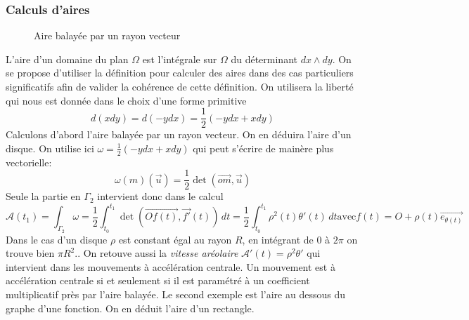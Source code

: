 \subsubsection{Calculs d'aires}
\begin{figure}
 \centering
  
  \caption{Aire balayée par un rayon vecteur}
  \label{fig:C2269_2}
\end{figure}
L'aire d'un domaine du plan $\Omega$ est l'intégrale sur $\Omega$ du déterminant $dx\wedge dy$.\newline
On se propose d'utiliser la définition pour calculer des aires dans des cas particuliers significatifs afin de valider la cohérence de cette définition. On utilisera la liberté qui nous est donnée dans le choix d'une forme primitive
\begin{displaymath}
 d(xdy)=d(-ydx)=\frac{1}{2}(-ydx + xdy)
\end{displaymath}
Calculons d'abord l'aire balayée par un rayon vecteur. On en déduira l'aire d'un disque.\newline
On utilise ici $\omega=\frac{1}{2}(-ydx + xdy)$ qui peut s'écrire de mainère plus vectorielle:
\begin{displaymath}
 \omega(m)(\overrightarrow u)=\frac{1}{2}\det(\overrightarrow{om},\overrightarrow u)
\end{displaymath}
Seule la partie en $\Gamma_2$ intervient donc dans le calcul
\begin{displaymath}
 \mathcal{A}(t_1)=\int_{\Gamma_2} \omega = \frac{1}{2}\int_{t_0}^{t_1}\det(\overrightarrow{Of(t)},\overrightarrow{f'}(t))\,dt
= \frac{1}{2}\int_{t_0}^{t_1}\rho^2(t)\theta'(t)\,dt \text{avec}
f(t)=O+\rho(t)\overrightarrow{e_{\theta(t)}}
\end{displaymath}
Dans le cas d'un disque $\rho$ est constant égal au rayon $R$, en intégrant de $0$ à $2\pi$ on trouve bien $\pi R^2$.. On retouve aussi la \emph{vitesse aréolaire}  $\mathcal A'(t)=\rho^2\theta'$ qui intervient dans les mouvements à accélération centrale. Un mouvement est à accélération centrale si et seulement si il est paramétré à un coefficient multiplicatif près par l'aire balayée.\newline
Le second exemple est l'aire au dessous du graphe d'une fonction. On en déduit l'aire d'un rectangle.

